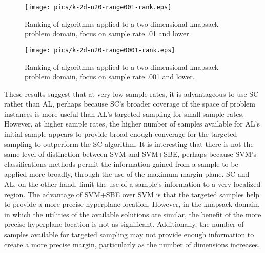 \begin{figure}
\begin{center}
\texttt{[image: pics/k-2d-n20-range001-rank.eps]}
\caption{Ranking of algorithms applied to a two-dimensional knapsack problem domain, focus on sample rate .01 and lower.}
\label{fig:knapsack-2d-range001-rank}
\end{center}
\end{figure}

\begin{figure}
\begin{center}
\texttt{[image: pics/k-2d-n20-range0001-rank.eps]}
\caption{Ranking of algorithms applied to a two-dimensional knapsack problem domain, focus on sample rate .001 and lower.}
\label{fig:knapsack-2d-range0001-rank}
\end{center}
\end{figure}


These results suggest that at very low sample rates, it is advantageous to use SC rather than AL, perhaps because SC's broader coverage of the space of problem instances is more useful than AL's targeted sampling for small sample rates.  However, at higher sample rates, the higher number of samples available for AL's initial sample appears to provide broad enough converage for the targeted sampling  to outperform the SC algorithm.  It is interesting that there is not the same level of distinction between SVM and SVM+SBE, perhaps because SVM's classifications methods permit the information gained from a sample to be applied more broadly, through the use of the maximum margin plane.  SC and AL, on the other hand, limit the use of a sample's information to a very localized region.  The advantage of SVM+SBE over SVM is that the targeted samples help to provide a more precise hyperplane location.  However, in the knapsack domain, in which the utilities of the available solutions are similar,  the benefit of the more precise hyperplane location is not as significant.  Additionally, the number of samples available for targeted sampling may not provide enough information to create a more precise margin, particularly as the number of dimensions increases.




